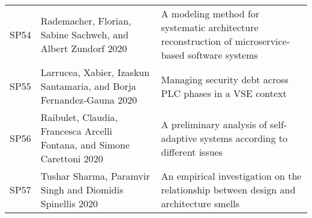 \begin{tabular}{lll}
 SP54 &             Rademacher, Florian, Sabine Sachweh, and Albert Zundorf 2020 &                                                                       A modeling method for systematic architecture reconstruction of microservice-based software systems \\
 SP55 &     Larrucea, Xabier, Izaskun Santamaria, and Borja Fernandez‐Gauna 2020 &                                                                                                                 Managing security debt across PLC phases in a VSE context \\
 SP56 &  Raibulet, Claudia, Francesca Arcelli Fontana, and Simone Carettoni 2020 &                                                                                             A preliminary analysis of self-adaptive systems according to different issues \\
 SP57 &                Tushar Sharma, Paramvir Singh and Diomidis Spinellis 2020 &                                                                                     An empirical investigation on the relationship between design and architecture smells \\
\bottomrule
\end{tabular}
